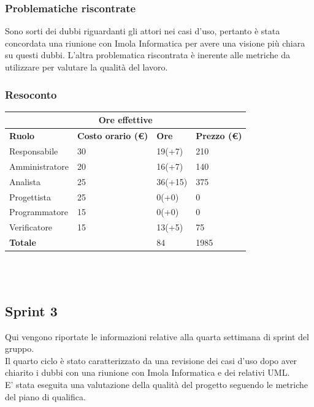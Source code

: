\documentclass[9pt]{article}
\begin{document}
\subsubsection{Problematiche riscontrate}
Sono sorti dei dubbi riguardanti gli attori nei casi d'uso, pertanto è stata concordata una riunione con Imola Informatica per avere una visione più chiara su questi dubbi.
L'altra problematica riscontrata è inerente alle metriche da utilizzare per valutare la qualità del lavoro.
\subsubsection{Resoconto}
\begin{center}
	\begin{tabularx}{\textwidth}{|X|X|X|X|}
		\hline
		\multicolumn{4}{|c|}{\textbf{Ore effettive}}                                      \\
		\hline
		\hline
		\textbf{Ruolo}  & \textbf{Costo orario (\euro)} & \textbf{Ore} & \textbf{Prezzo (\euro)} \\
		\hline
		Responsabile    & 30                            & 19(+7)       & 210                     \\
		\hline
		Amministratore  & 20                            & 16(+7)       & 140                     \\
		\hline
		Analista        & 25                            & 36(+15)      & 375                     \\
		\hline
		Progettista     & 25                            & 0(+0)        & 0                       \\
		\hline
		Programmatore   & 15                            & 0(+0)        & 0                       \\
		\hline
		Verificatore    & 15                            & 13(+5)       & 75                      \\
		\hline
		\hline
		\textbf{Totale} &                               & 84           & 1985                    \\
		\hline
	\end{tabularx}\\[8pt]
	\mbox{}\\
\end{center}


\subsection{Sprint 3}
Qui vengono riportate le informazioni relative alla quarta settimana di sprint del gruppo. \\
Il quarto ciclo è stato caratterizzato da una revisione dei casi d'uso dopo aver chiarito i dubbi con una riunione con Imola Informatica e dei relativi UML.\\
E' stata eseguita una valutazione della qualità del progetto seguendo le metriche del piano di qualifica.
\end{document}
